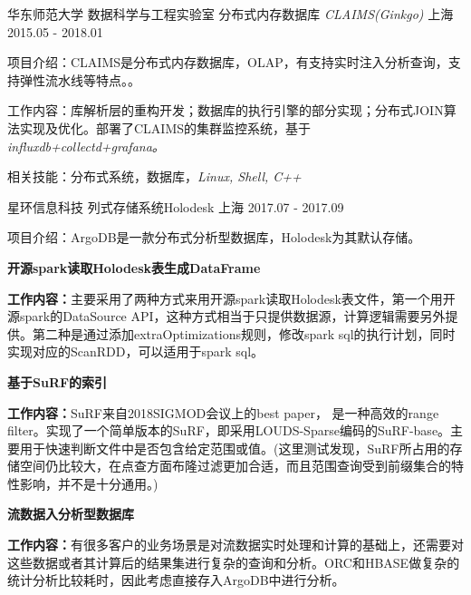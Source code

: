 \begin{cventries}
  \cventry
    {华东师范大学 \quad 数据科学与工程实验室  } 
    {分布式内存数据库  \it{CLAIMS(Ginkgo)}}
    {上海}
    {2015.05 - 2018.01}
    {
      \begin{cvitems}
	\item {项目介绍：CLAIMS是分布式内存数据库，OLAP，有支持实时注入分析查询，支持弹性流水线等特点。。}
	\item {工作内容：库解析层的重构开发；数据库的执行引擎的部分实现；分布式JOIN算法实现及优化。部署了CLAIMS的集群监控系统，基于\it{influxdb+collectd+grafana}。}
	\item {相关技能：分布式系统，数据库，\it{Linux, Shell, C++}}
      \end{cvitems}
    }

    \cventry
    {星环信息科技}
    {列式存储系统Holodesk}
    {上海}
    {2017.07 - 2017.09}
    {
      \begin{cvitems}
        \item {项目介绍：ArgoDB是一款分布式分析型数据库，Holodesk为其默认存储。}
      \end{cvitems}
    }

    \cventry
    {\textbf{开源spark读取Holodesk表生成DataFrame}}{}{}{}
    {
        \begin{cvitems}
          \item {\textbf{工作内容：}主要采用了两种方式来用开源spark读取Holodesk表文件，第一个用开源spark的DataSource API，这种方式相当于只提供数据源，计算逻辑需要另外提供。第二种是通过添加extraOptimizations规则，修改spark sql的执行计划，同时实现对应的ScanRDD，可以适用于spark sql。}
        \end{cvitems}
    }

    \cventry
    {\textbf{基于SuRF的索引}}{}{}{}
    {
        \begin{cvitems}
          \item {\textbf{工作内容：}SuRF来自2018SIGMOD会议上的best paper， 是一种高效的range filter。实现了一个简单版本的SuRF，即采用LOUDS-Sparse编码的SuRF-base。主要用于快速判断文件中是否包含给定范围或值。(这里测试发现，SuRF所占用的存储空间仍比较大，在点查方面布隆过滤更加合适，而且范围查询受到前缀集合的特性影响，并不是十分通用。)}
        \end{cvitems}
    }

    \cventry
    {\textbf{流数据入分析型数据库}}{}{}{}
    {
        \begin{cvitems}
          \item {\textbf{工作内容：}有很多客户的业务场景是对流数据实时处理和计算的基础上，还需要对这些数据或者其计算后的结果集进行复杂的查询和分析。ORC和HBASE做复杂的统计分析比较耗时，因此考虑直接存入ArgoDB中进行分析。}
        \end{cvitems}
    }

\end{cventries}


